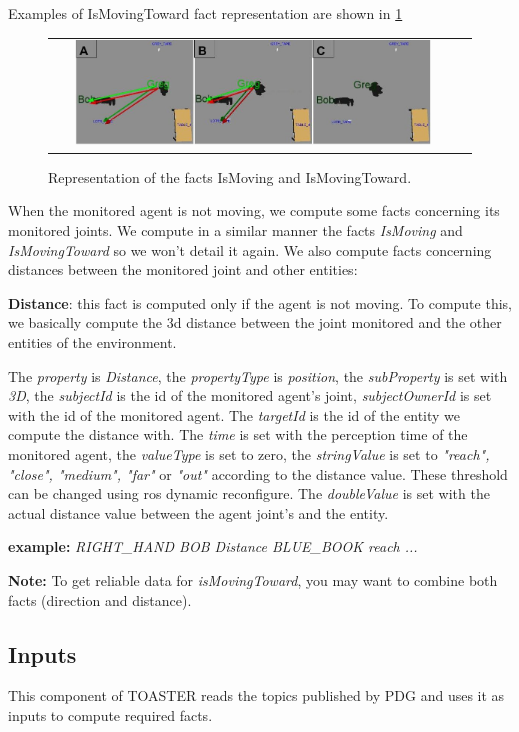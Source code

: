 \documentclass[a4paper]{article}
\begin{document}
Examples of IsMovingToward fact representation are shown in \ref{fig:mvTwd}


 \begin{figure}[ht!]
 \centering
 \begin{tabular}{cc}
  \includegraphics[width=0.90\textwidth]{img/movingToward.jpg}
 \end{tabular}
 \caption{Representation of the facts IsMoving and IsMovingToward.}
 \label{fig:mvTwd}
 \end{figure}

When the monitored agent is not moving, we compute some facts concerning its monitored joints.
We compute in a similar manner the facts \textit{IsMoving} and \textit{IsMovingToward} so we won't detail it again.
We also compute facts concerning distances between the monitored joint and other entities:

 \textbf{Distance}: this fact is computed only if the agent is not moving.
To compute this, we basically compute the 3d distance between the joint monitored and the other entities of the environment.

The \textit{property} is \textit{Distance}, the \textit{propertyType} is \textit{position}, the \textit{subProperty} is set with \textit{3D}, the \textit{subjectId} is the id of the monitored agent's joint, \textit{subjectOwnerId} is set with the id of the monitored agent. The \textit{targetId} is the id of the entity we compute the distance with. The \textit{time} is set with the perception time of the monitored agent, the \textit{valueType} is set to zero, the \textit{stringValue} is set to \textit{"reach", "close", "medium", "far"} or \textit{"out"} according to the distance value. These threshold can be changed using ros dynamic reconfigure. The \textit{doubleValue} is set with the actual distance value between the agent joint's and the entity.

\textbf{example:} \textit{RIGHT\_HAND BOB Distance BLUE\_BOOK reach  ...}


\textbf{Note:} To get reliable data for \textit{isMovingToward}, you may want to combine both facts (direction and distance).
 
\subsection{Inputs}
This component of TOASTER reads the topics published by PDG and uses it as inputs to compute required facts.
\end{document}
